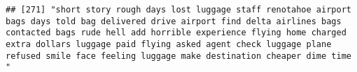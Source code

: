 \documentclass[
]{article}
\begin{document}
\begin{verbatim}
## [271] "short story rough days lost luggage staff renotahoe airport bags days told bag delivered drive airport find delta airlines bags contacted bags rude hell add horrible experience flying home charged extra dollars luggage paid flying asked agent check luggage plane refused smile face feeling luggage make destination cheaper dime time "                                                                                                                                                                                                                                                                                                                                                                                                                                                                                                                                                                                                                                                                                                                                                                                                                                                                                                                                                                                                                                                                                                                                                                                                                                                                                                                                                                                                                                                 

\end{verbatim}
\end{document}
